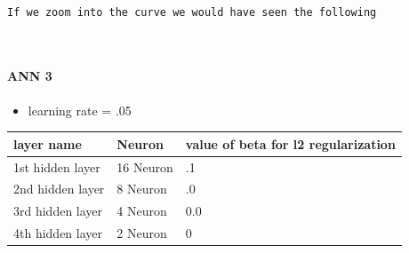 \documentclass[11pt, a4paper , landscape]{article}
\providecommand{\tightlist}{%
      \setlength{\itemsep}{0pt}\setlength{\parskip}{0pt}}
\begin{document}
    \begin{center}
    \end{center}
    { \hspace*{\fill} \\}
    
    \begin{Verbatim}[commandchars=\\\{\}]
If we zoom into the curve we would have seen the following

    \end{Verbatim}

    \begin{center}
    \end{center}
    { \hspace*{\fill} \\}
    
    \paragraph{ANN 3}\label{ann-3}

\begin{itemize}
\tightlist
\item
  learning rate = .05
\end{itemize}

\begin{longtable}[]{@{}lll@{}}
\toprule
layer name & Neuron & value of beta for l2 regularization\tabularnewline
\midrule
\endhead
1st hidden layer & 16 Neuron & .1\tabularnewline
2nd hidden layer & 8 Neuron & .0\tabularnewline
3rd hidden layer & 4 Neuron & 0.0\tabularnewline
4th hidden layer & 2 Neuron & 0\tabularnewline
\bottomrule
\end{longtable}
\end{document}
